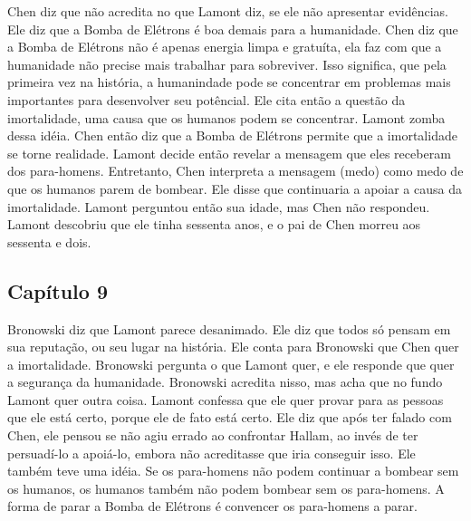 \documentclass[14pt,portuguese]{extreport}
\begin{document}
	  Chen diz que não acredita no que Lamont diz, se ele não apresentar evidências. Ele diz que a 
	  Bomba de Elétrons é boa demais para a humanidade. Chen diz que a Bomba de Elétrons não é 
	  apenas energia limpa e gratuíta, ela faz com que a humanidade não precise mais trabalhar 
	  para sobreviver. Isso significa, que pela primeira vez na história, a humanindade pode se 
	  concentrar em problemas mais importantes para desenvolver seu potêncial. Ele cita então a 
	  questão da imortalidade, uma causa que os humanos podem se concentrar. Lamont zomba dessa 
	  idéia. Chen então diz que a Bomba de Elétrons permite que a imortalidade se torne realidade. 
	  Lamont decide então revelar a mensagem que eles receberam dos para-homens. Entretanto, 
	  Chen interpreta a mensagem (medo) como medo de que os humanos parem de bombear. Ele disse 
	  que continuaria a apoiar a causa da imortalidade. Lamont perguntou então sua idade, mas 
	  Chen não respondeu. Lamont descobriu que ele tinha sessenta anos, e o pai de Chen morreu aos 
	  sessenta e dois.

	\subsection{Capítulo 9}

	  Bronowski diz que Lamont parece desanimado. Ele diz que todos só pensam em sua reputação, ou 
	  seu lugar na história. Ele conta para Bronowski que Chen quer a imortalidade. Bronowski 
	  pergunta o que Lamont quer, e ele responde que quer a segurança da humanidade. Bronowski 
	  acredita nisso, mas acha que no fundo Lamont quer outra coisa. Lamont confessa que ele quer 
	  provar para as pessoas que ele está certo, porque ele de fato está certo. Ele diz que após ter 
	  falado com Chen, ele pensou se não agiu errado ao confrontar Hallam, ao invés de ter 
	  persuadí-lo a apoiá-lo, embora não acreditasse que iria conseguir isso. Ele também teve uma 
	  idéia. Se os para-homens não podem continuar a bombear sem os humanos, os humanos também não 
	  podem bombear sem os para-homens. A forma de parar a Bomba de Elétrons é convencer os 
	  para-homens a parar.
	  
\end{document}
